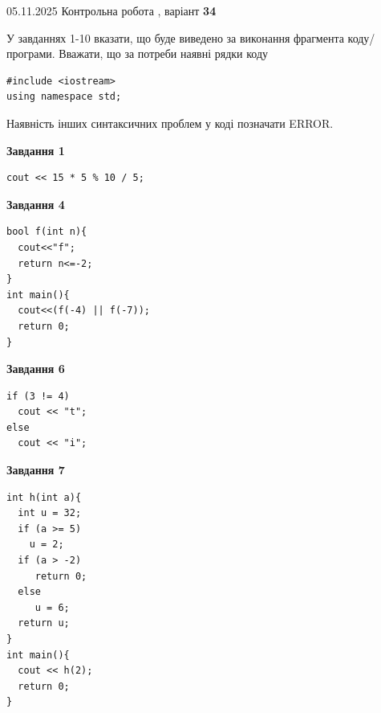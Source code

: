 \documentclass[12pt, ukrainian]{article}
\begin{document}
\newpage

{\Large{05.11.2025 Контрольна робота , варіант  \No \textbf { 34 }\par}}
{
\begin {large}
У завданнях 1-10 вказати, що буде виведено за виконання фрагмента коду/про\-гра\-ми.
Вважати, що за потреби наявні рядки коду
\begin{verbatim}
#include <iostream>
using namespace std;
\end{verbatim}
Наявність інших синтаксичних проблем у коді позначати ERROR.

\begin{minipage}[t]{7.0cm}

\begin{center}
\textbf{Завдання 1}
\end{center}
\vspace{-8mm}

\begin{verbatim}
cout << 15 * 5 % 10 / 5;
\end{verbatim}



\begin{center}
\textbf{Завдання 4}
\end{center}
\vspace{-8mm}

\begin{verbatim}
bool f(int n){
  cout<<"f";
  return n<=-2;
}
int main(){
  cout<<(f(-4) || f(-7));
  return 0;
}
\end{verbatim}



\begin{center}
\textbf{Завдання 6}
\end{center}
\vspace{-8mm}

\begin{verbatim}
if (3 != 4)
  cout << "t";
else
  cout << "i";
\end{verbatim}



\begin{center}
\textbf{Завдання 7}
\end{center}
\vspace{-8mm}

\begin{verbatim}
int h(int a){
  int u = 32;
  if (a >= 5)
    u = 2;
  if (a > -2)
     return 0;
  else
     u = 6;
  return u;
}
int main(){
  cout << h(2);
  return 0;
}
\end{verbatim}


\end{minipage}
\end{large}}
\end{document}

